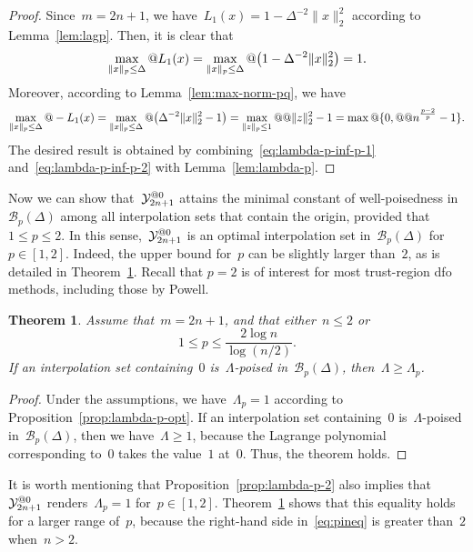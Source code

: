 \documentclass{article}
\makeatletter
\theoremstyle{definition}
\theoremstyle{plain}
\newtheorem{theorem}{Theorem}[section]
\theoremstyle{remark}
\newcommand*{\norm}[2][]{#1\lVert#2#1\rVert}
\newcommand*{\set}[2][]{#1\{#2#1\}}
\newcommand*{\lagp}[1][]{L\ifblank{#1}{}{_{#1}}}
\newcommand*{\xpt}[1][]{\mathcal{Y}\ifblank{#1}{}{^{@#1}}}
\makeatother
\begin{document}
\begin{proof}
    Since~$m = 2n + 1$, we have~$L_1(x) = 1 - \Delta^{-2}\norm{x}_2^2$ according to Lemma~\ref{lem:lagp}.
    Then, it is clear that
    \begin{equation}
        \label{eq:lambda-p-inf-p-1}
        \max_{\norm{x}_p \le \Delta} @ \lagp[1](x) = \max_{\norm{x}_p \le \Delta} @ \big( 1 - \Delta^{-2}{\norm{x}_2^2} \big) = 1.
    \end{equation}
    Moreover, according to Lemma~\ref{lem:max-norm-pq}, we have
    \begin{equation}
        \label{eq:lambda-p-inf-p-2}
        \max_{\norm{x}_p \le \Delta} @ -\lagp[1](x) = \max_{\norm{x}_p \le \Delta} @ \big( \Delta^{-2} \norm{x}_2^2 - 1 \big) = \max_{\norm{z}_p \le 1} @@ \norm{z}_2^2 - 1 = \max @ \set{0, @@ n^{\frac{p - 2}{p}} - 1}.
    \end{equation}
    The desired result is obtained by combining~\eqref{eq:lambda-p-inf-p-1} and~\eqref{eq:lambda-p-inf-p-2} with Lemma~\ref{lem:lambda-p}.
\end{proof}

Now we can show that~$\xpt[0]_{2n + 1}$ attains the minimal constant of well-poisedness in~$\mathcal{B}_p(\Delta)$ among all interpolation sets that contain the origin, provided that~$1 \le p \le 2$.
In this sense,~$\xpt[0]_{2n + 1}$ is an optimal interpolation set in~$\mathcal{B}_p(\Delta)$ for~$p \in [1, 2]$.
Indeed, the upper bound for~$p$ can be slightly larger than~$2$, as is detailed in Theorem~\ref{thm:optimset}.
Recall that $p = 2$ is of interest for most trust-region \gls{dfo} methods, including those by Powell.

\begin{theorem}
    \label{thm:optimset}
    Assume that~$m = 2n + 1$, and that either~$n \le 2$ or
    \begin{equation}
        \label{eq:pineq}
        1 \le p \le \frac{2 \log n}{\log (n/2)}.
    \end{equation}
    If an interpolation set containing~$0$ is~$\Lambda$-poised in~$\mathcal{B}_p(\Delta)$, then~$\Lambda \ge \Lambda_p$.
\end{theorem}

\begin{proof}
    Under the assumptions, we have~$\Lambda_p = 1$ according to Proposition~\ref{prop:lambda-p-opt}.
    If an interpolation set containing~$0$ is~$\Lambda$-poised in~$\mathcal{B}_p(\Delta)$, then we
    have~$\Lambda \ge 1$, because the Lagrange polynomial corresponding to~$0$ takes the value~$1$ at~$0$.
    Thus, the theorem holds.
\end{proof}
It is worth mentioning that Proposition~\ref{prop:lambda-p-2} also implies that~$\xpt[0]_{2n + 1}$ renders~$\Lambda_p = 1$ for~$p \in [1, 2]$.
Theorem~\ref{thm:optimset} shows that this equality holds for a larger range of~$p$, because the right-hand side in~\eqref{eq:pineq} is greater than~$2$ when~$n > 2$.
\end{document}
